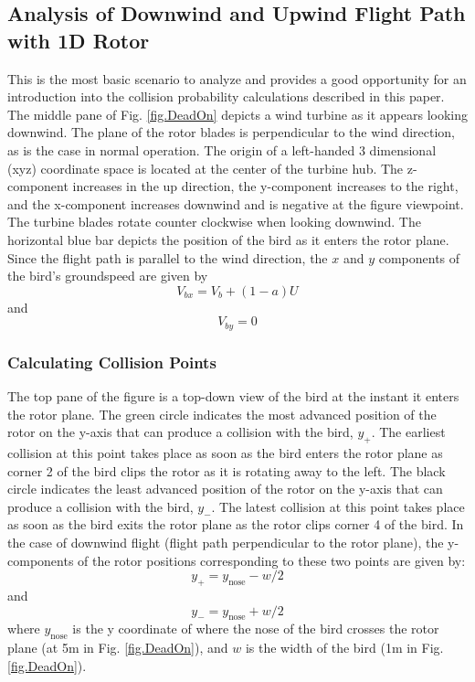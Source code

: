 \label{} \documentclass[10pt,conference]{IEEEtran}
\begin{document}
\subsection{Analysis of Downwind and Upwind Flight Path with 1D Rotor}
This is the most basic scenario to analyze and provides a good opportunity for an introduction into the collision
probability calculations described in this paper. The middle pane of Fig. \ref{fig.DeadOn} depicts a wind turbine as it
appears looking downwind. The plane of the rotor blades is perpendicular to the wind direction, as is the case in
normal operation. The origin of a left-handed 3 dimensional (xyz) coordinate space is located at the center of the
turbine hub. The z-component increases in the up direction, the y-component increases to the right, and the x-component
increases downwind and is negative at the figure viewpoint. The turbine blades rotate counter clockwise when looking
downwind. The horizontal blue bar depicts the position of the bird as it enters the rotor plane. Since the flight path
is parallel to the wind direction, the $x$ and $y$ components of the bird's groundspeed are given by
\begin{equation*}
    V_{bx} = V_b +(1-a)U
\end{equation*}
and
\begin{equation*}
    V_{by} = 0
\end{equation*}


\subsubsection{Calculating Collision Points}
The top pane of the figure is a top-down view of the bird at the instant it enters the rotor plane. The green circle
indicates the most advanced position of the rotor on the y-axis that can produce a collision with the bird, $y_+$. The
earliest collision at this point takes place as soon as the bird enters the rotor plane as corner 2 of the bird clips
the rotor as it is rotating away to the left. The black circle indicates the least advanced position of the rotor on
the y-axis that can produce a collision with the bird, $y_-$. The latest collision at this point takes place as soon as
the bird exits the rotor plane as the rotor clips corner 4 of the bird. In the case of downwind flight (flight path
perpendicular to the rotor plane), the y-components of the rotor positions corresponding to these two points are given
by:
\begin{equation*}\label{DeadOnLeft}
    y_{+} = y_{\text{nose}} - w/2
\end{equation*}
and
\begin{equation*}\label{DeadOnRight}
    y_{-} = y_{\text{nose}} + w/2
\end{equation*}
where $y_{\text{nose}}$ is the y coordinate of where the nose of the bird crosses the rotor plane (at 5m in Fig.
\ref{fig.DeadOn}), and $w$ is the width of the bird (1m in Fig. \ref{fig.DeadOn}).
\end{document}
